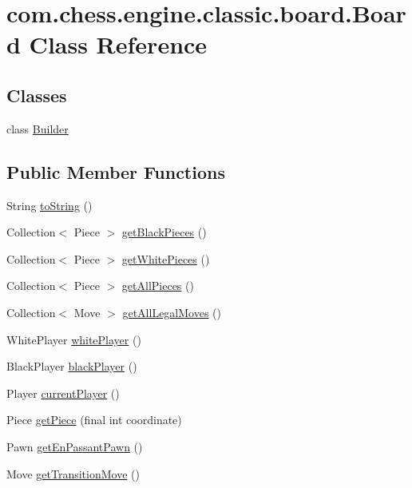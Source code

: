 \hypertarget{classcom_1_1chess_1_1engine_1_1classic_1_1board_1_1_board}{}\section{com.\+chess.\+engine.\+classic.\+board.\+Board Class Reference}
\label{classcom_1_1chess_1_1engine_1_1classic_1_1board_1_1_board}
\subsection*{Classes}
\begin{DoxyCompactItemize}
\item 
class \mbox{\hyperlink{classcom_1_1chess_1_1engine_1_1classic_1_1board_1_1_board_1_1_builder}{Builder}}
\end{DoxyCompactItemize}
\subsection*{Public Member Functions}
\begin{DoxyCompactItemize}
\item 
String \mbox{\hyperlink{classcom_1_1chess_1_1engine_1_1classic_1_1board_1_1_board_a2e2bef66bba93c69586e9a7f19e175b9}{to\+String}} ()
\item 
Collection$<$ Piece $>$ \mbox{\hyperlink{classcom_1_1chess_1_1engine_1_1classic_1_1board_1_1_board_a95b66fc2591444c0ca179ad5dc1666a0}{get\+Black\+Pieces}} ()
\item 
Collection$<$ Piece $>$ \mbox{\hyperlink{classcom_1_1chess_1_1engine_1_1classic_1_1board_1_1_board_a2c52aeb881e4899c5608d1007ab28a0f}{get\+White\+Pieces}} ()
\item 
Collection$<$ Piece $>$ \mbox{\hyperlink{classcom_1_1chess_1_1engine_1_1classic_1_1board_1_1_board_abef72e6eb498558b6b66f8754cda4541}{get\+All\+Pieces}} ()
\item 
Collection$<$ Move $>$ \mbox{\hyperlink{classcom_1_1chess_1_1engine_1_1classic_1_1board_1_1_board_a0f515dfcea2c3535d28a285470ee7145}{get\+All\+Legal\+Moves}} ()
\item 
White\+Player \mbox{\hyperlink{classcom_1_1chess_1_1engine_1_1classic_1_1board_1_1_board_a8d9636240bd6fb8fbca82e4d823fdedd}{white\+Player}} ()
\item 
Black\+Player \mbox{\hyperlink{classcom_1_1chess_1_1engine_1_1classic_1_1board_1_1_board_a7efcf4a55338975e89dc14be3dc5c0f9}{black\+Player}} ()
\item 
Player \mbox{\hyperlink{classcom_1_1chess_1_1engine_1_1classic_1_1board_1_1_board_a67d1dc377ce8d803de3681cdb5609e44}{current\+Player}} ()
\item 
Piece \mbox{\hyperlink{classcom_1_1chess_1_1engine_1_1classic_1_1board_1_1_board_a5f774937f4612af06d221f499a93d0a7}{get\+Piece}} (final int coordinate)
\item 
Pawn \mbox{\hyperlink{classcom_1_1chess_1_1engine_1_1classic_1_1board_1_1_board_a6df13461883643733498590b47c8ba0b}{get\+En\+Passant\+Pawn}} ()
\item 
Move \mbox{\hyperlink{classcom_1_1chess_1_1engine_1_1classic_1_1board_1_1_board_a6a5d7c041828d10e8a64bf99915d7675}{get\+Transition\+Move}} ()
\end{DoxyCompactItemize}

